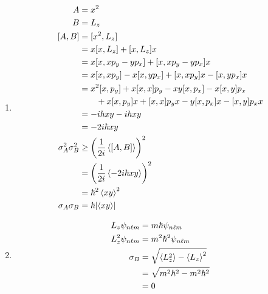 \documentclass{article}
\begin{document}
\setcounter{subsection}{56}
\subsection{}

\begin{enumerate}
  \item

        \begin{align*}
          A                     & = x^2                                                              \\
          B                     & = L_z                                                              \\
          [A, B]                & = [x^2, L_z]                                                       \\
                                & = x [x, L_z] + [x, L_z] x                                          \\
                                & = x [x, x p_y - y p_x] + [x, x p_y - y p_x] x                      \\
                                & = x [x, x p_y] - x [x, y p_x] + [x, x p_y] x - [x, y p_x] x        \\
                                & = x^2 [x, p_y] + x [x, x] p_y - x y [x, p_x] - x [x, y] p_x        \\
                                & \qquad + x [x, p_y] x + [x, x] p_y x - y [x, p_x] x - [x, y] p_x x \\
                                & = -i \hbar x y - i \hbar x y                                       \\
                                & = -2 i \hbar x y                                                   \\
          \sigma_A^2 \sigma_B^2 & \ge \left( \frac{1}{2 i} \braket{[A, B]} \right)^2                 \\
                                & = \left( \frac{1}{2 i} \braket{-2 i \hbar x y} \right)^2           \\
                                & = \hbar^2 \braket{x y}^2                                           \\
          \sigma_A \sigma_B     & = \hbar |\langle x y \rangle|
        \end{align*}

  \item

        \begin{align*}
          L_z \psi_{n \ell m}   & = m \hbar \psi_{n \ell m}                \\
          L_z^2 \psi_{n \ell m} & = m^2 \hbar^2 \psi_{n \ell m}            \\
          \sigma_B              & = \sqrt{\braket{L_z^2} - \braket{L_z}^2} \\
                                & = \sqrt{m^2 \hbar^2 - m^2 \hbar^2}       \\
                                & = 0
        \end{align*}


\end{enumerate}
\end{document}
